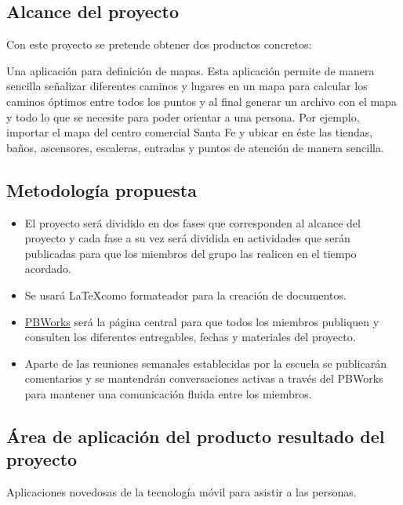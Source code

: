 \documentclass[letterpaper,11pt]{article}
\begin{document}
	\subsection{Alcance del proyecto}
	
        Con este proyecto se pretende obtener dos productos concretos:

		Una aplicación para definición de mapas. Esta aplicación permite de manera sencilla señalizar 
		diferentes caminos y lugares en un mapa para calcular los caminos 
		óptimos entre todos los puntos y al final generar un archivo con 
		el mapa y todo lo que se necesite para poder orientar a una persona.
		Por ejemplo, importar el mapa del centro comercial Santa Fe y ubicar 
		en éste las tiendas, baños, ascensores, escaleras, entradas y puntos 
		de atención de manera sencilla.

	\subsection{Metodología propuesta}
	
	\begin{itemize}
		\item 	El proyecto será dividido en dos fases que corresponden 
		al alcance del proyecto y cada fase a su vez será dividida en 
		actividades que serán publicadas para que los miembros del 
		grupo las realicen en el tiempo acordado.

		\item Se usará \LaTeX como formateador para la creación de 
		documentos.

		\item \href{http://maeocs.pbworks.com}{PBWorks} será la página 
		central para que todos los miembros 
		publiquen y consulten los diferentes entregables, fechas y 
		materiales del proyecto.
		
		\item Aparte de las reuniones semanales establecidas por la 
		escuela se publicarán comentarios y se mantendrán conversaciones 
		activas	a través del PBWorks para mantener una comunicación 
		fluida entre los miembros.
	\end{itemize}
	
	\subsection{Área de aplicación del producto resultado del proyecto}
	
        Aplicaciones novedosas de la tecnología móvil para asistir a las 
        personas.
	
\end{document}
